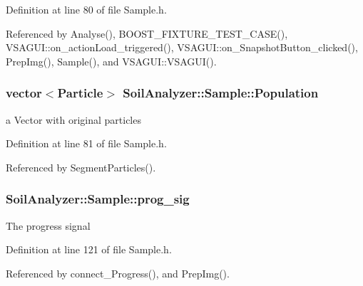 Definition at line 80 of file Sample.\+h.



Referenced by Analyse(), B\+O\+O\+S\+T\+\_\+\+F\+I\+X\+T\+U\+R\+E\+\_\+\+T\+E\+S\+T\+\_\+\+C\+A\+S\+E(), V\+S\+A\+G\+U\+I\+::on\+\_\+action\+Load\+\_\+triggered(), V\+S\+A\+G\+U\+I\+::on\+\_\+\+Snapshot\+Button\+\_\+clicked(), Prep\+Img(), Sample(), and V\+S\+A\+G\+U\+I\+::\+V\+S\+A\+G\+U\+I().

\hypertarget{class_soil_analyzer_1_1_sample_ab87a190f2b4a49bc71b355f9c52d8aa4}{}
\subsubsection[{Population}]{\setlength{\rightskip}{0pt plus 5cm}vector$<${\bf Particle}$>$ Soil\+Analyzer\+::\+Sample\+::\+Population}\label{class_soil_analyzer_1_1_sample_ab87a190f2b4a49bc71b355f9c52d8aa4}
a Vector with original particles 

Definition at line 81 of file Sample.\+h.



Referenced by Segment\+Particles().

\hypertarget{class_soil_analyzer_1_1_sample_aab3a7522152890650245a1f069605a13}{}
\subsubsection[{prog\+\_\+sig}]{ Soil\+Analyzer\+::\+Sample\+::prog\+\_\+sig\hspace{0.3cm}{\ttfamily [private]}}\label{class_soil_analyzer_1_1_sample_aab3a7522152890650245a1f069605a13}
The progress signal 

Definition at line 121 of file Sample.\+h.



Referenced by connect\+\_\+\+Progress(), and Prep\+Img().

\hypertarget{class_soil_analyzer_1_1_sample_ab242ae1c2f229168fd630a9f31d7237f}{}
